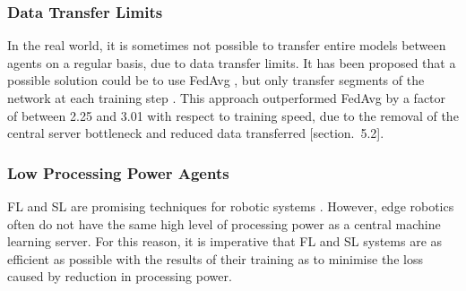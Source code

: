 \subsubsection{Data Transfer Limits}
In the real world, it is sometimes not possible to transfer entire models between agents on a regular basis, due to data transfer limits. It has been proposed that a possible solution could be to use FedAvg \cite{fed_learning}, but only transfer segments of the network at each training step \cite{gossip_learning}. This approach outperformed FedAvg by a factor of between 2.25 and 3.01 with respect to training speed, due to the removal of the central server bottleneck and reduced data transferred \cite{gossip_learning}[section.~5.2].

\subsubsection{Low Processing Power Agents}
FL and SL are promising techniques for robotic systems \cite{fed_in_robotics}. However, edge robotics often do not have the same high level of processing power as a central machine learning server. For this reason, it is imperative that FL and SL systems are as efficient as possible with the results of their training as to minimise the loss caused by reduction in processing power.
